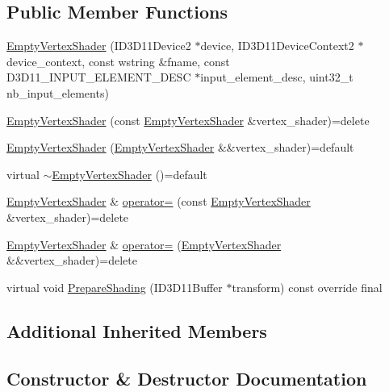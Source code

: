 \subsection*{Public Member Functions}
\begin{DoxyCompactItemize}
\item 
\hyperlink{classmage_1_1_empty_vertex_shader_a28fae401cf46242513144278dcd7f051}{Empty\+Vertex\+Shader} (I\+D3\+D11\+Device2 $\ast$device, I\+D3\+D11\+Device\+Context2 $\ast$device\+\_\+context, const wstring \&fname, const D3\+D11\+\_\+\+I\+N\+P\+U\+T\+\_\+\+E\+L\+E\+M\+E\+N\+T\+\_\+\+D\+E\+SC $\ast$input\+\_\+element\+\_\+desc, uint32\+\_\+t nb\+\_\+input\+\_\+elements)
\item 
\hyperlink{classmage_1_1_empty_vertex_shader_a6ab1b22d108fde8f8876e6a2e4c0decb}{Empty\+Vertex\+Shader} (const \hyperlink{classmage_1_1_empty_vertex_shader}{Empty\+Vertex\+Shader} \&vertex\+\_\+shader)=delete
\item 
\hyperlink{classmage_1_1_empty_vertex_shader_a04d905fda6f77338521746fee50e6bf7}{Empty\+Vertex\+Shader} (\hyperlink{classmage_1_1_empty_vertex_shader}{Empty\+Vertex\+Shader} \&\&vertex\+\_\+shader)=default
\item 
virtual \hyperlink{classmage_1_1_empty_vertex_shader_a321ef00a2087030b81713e989ab02306}{$\sim$\+Empty\+Vertex\+Shader} ()=default
\item 
\hyperlink{classmage_1_1_empty_vertex_shader}{Empty\+Vertex\+Shader} \& \hyperlink{classmage_1_1_empty_vertex_shader_a2683d29127405d51737008637ebde098}{operator=} (const \hyperlink{classmage_1_1_empty_vertex_shader}{Empty\+Vertex\+Shader} \&vertex\+\_\+shader)=delete
\item 
\hyperlink{classmage_1_1_empty_vertex_shader}{Empty\+Vertex\+Shader} \& \hyperlink{classmage_1_1_empty_vertex_shader_a449401b726fc5cd30012a3d8df2e0832}{operator=} (\hyperlink{classmage_1_1_empty_vertex_shader}{Empty\+Vertex\+Shader} \&\&vertex\+\_\+shader)=delete
\item 
virtual void \hyperlink{classmage_1_1_empty_vertex_shader_a6b3619814f0d59bcf4b4edf2dab9a10c}{Prepare\+Shading} (I\+D3\+D11\+Buffer $\ast$transform) const override final
\end{DoxyCompactItemize}
\subsection*{Additional Inherited Members}


\subsection{Constructor \& Destructor Documentation}
\hypertarget{classmage_1_1_empty_vertex_shader_a28fae401cf46242513144278dcd7f051}{}\label{classmage_1_1_empty_vertex_shader_a28fae401cf46242513144278dcd7f051} 

